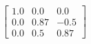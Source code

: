 \documentclass[preview]{standalone}
\begin{document}
\begin{align*}
\left[ \begin{array}{ccc}1.0 & 0.0 & 0.0 \\ 0.0 & 0.87 & -0.5 \\ 0.0 & 0.5 & 0.87\end{array} \right]
\end{align*}
\end{document}
